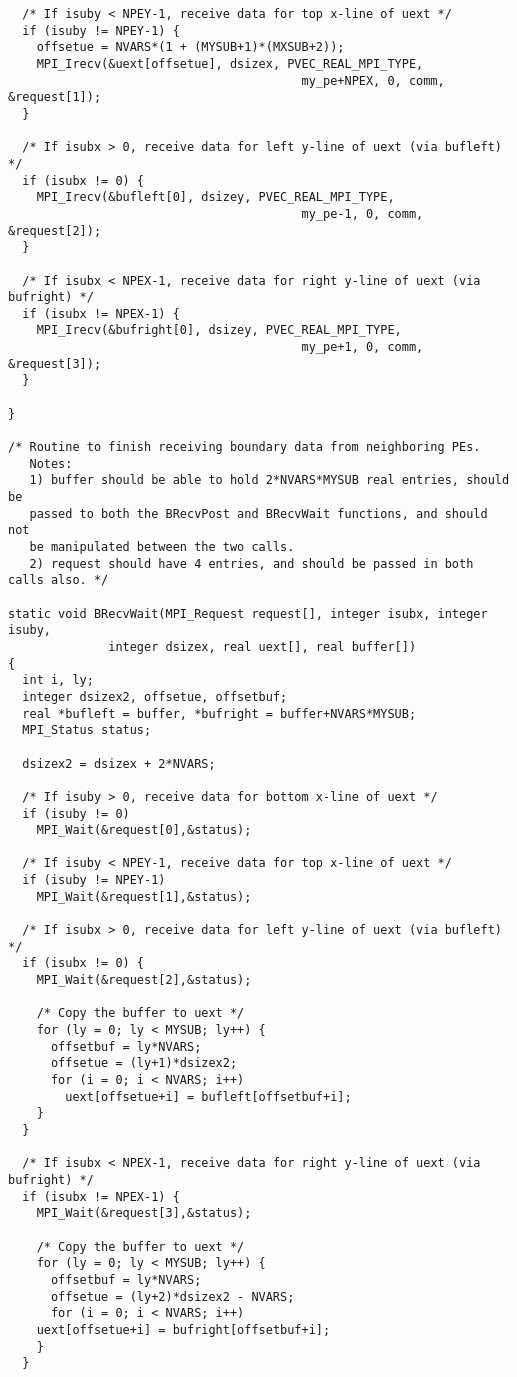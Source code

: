 \begin{verbatim}
  /* If isuby < NPEY-1, receive data for top x-line of uext */
  if (isuby != NPEY-1) {
    offsetue = NVARS*(1 + (MYSUB+1)*(MXSUB+2));
    MPI_Irecv(&uext[offsetue], dsizex, PVEC_REAL_MPI_TYPE,
                                         my_pe+NPEX, 0, comm, &request[1]);
  }

  /* If isubx > 0, receive data for left y-line of uext (via bufleft) */
  if (isubx != 0) {
    MPI_Irecv(&bufleft[0], dsizey, PVEC_REAL_MPI_TYPE,
                                         my_pe-1, 0, comm, &request[2]);
  }

  /* If isubx < NPEX-1, receive data for right y-line of uext (via bufright) */
  if (isubx != NPEX-1) {
    MPI_Irecv(&bufright[0], dsizey, PVEC_REAL_MPI_TYPE,
                                         my_pe+1, 0, comm, &request[3]);
  }

}

/* Routine to finish receiving boundary data from neighboring PEs.
   Notes:
   1) buffer should be able to hold 2*NVARS*MYSUB real entries, should be
   passed to both the BRecvPost and BRecvWait functions, and should not
   be manipulated between the two calls.
   2) request should have 4 entries, and should be passed in both calls also. */

static void BRecvWait(MPI_Request request[], integer isubx, integer isuby,
		      integer dsizex, real uext[], real buffer[])
{
  int i, ly;
  integer dsizex2, offsetue, offsetbuf;
  real *bufleft = buffer, *bufright = buffer+NVARS*MYSUB;
  MPI_Status status;

  dsizex2 = dsizex + 2*NVARS;

  /* If isuby > 0, receive data for bottom x-line of uext */
  if (isuby != 0)
    MPI_Wait(&request[0],&status);

  /* If isuby < NPEY-1, receive data for top x-line of uext */
  if (isuby != NPEY-1)
    MPI_Wait(&request[1],&status);

  /* If isubx > 0, receive data for left y-line of uext (via bufleft) */
  if (isubx != 0) {
    MPI_Wait(&request[2],&status);

    /* Copy the buffer to uext */
    for (ly = 0; ly < MYSUB; ly++) {
      offsetbuf = ly*NVARS;
      offsetue = (ly+1)*dsizex2;
      for (i = 0; i < NVARS; i++)
        uext[offsetue+i] = bufleft[offsetbuf+i];
    }
  }

  /* If isubx < NPEX-1, receive data for right y-line of uext (via bufright) */
  if (isubx != NPEX-1) {
    MPI_Wait(&request[3],&status);

    /* Copy the buffer to uext */
    for (ly = 0; ly < MYSUB; ly++) {
      offsetbuf = ly*NVARS;
      offsetue = (ly+2)*dsizex2 - NVARS;
      for (i = 0; i < NVARS; i++)
	uext[offsetue+i] = bufright[offsetbuf+i];
    }
  }


\end{verbatim}
